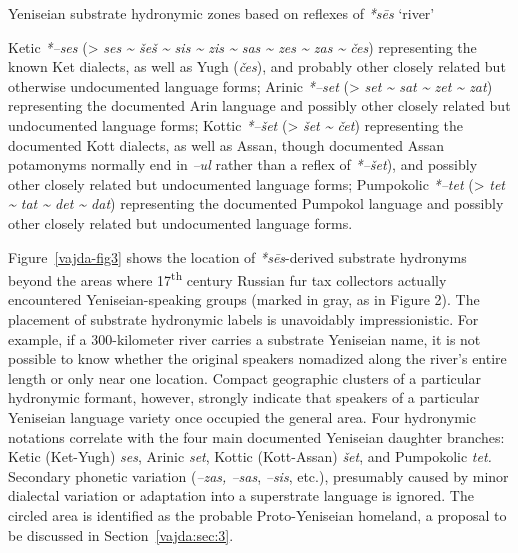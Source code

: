 
\begin{exe}\label{vajda-substrate}
\ex Yeniseian substrate hydronymic zones based on reflexes of \textit{*s\=es} ‘river’
\begin{xlist}
\ex Ketic \textit{*–ses} ({\textgreater}\textit{ ses \~{} šeš \~{} sis \~{} zis \~{} sas \~{} zes \~{} zas \~{} čes}) representing the known Ket dialects, as well as Yugh (\textit{čes}), and probably other closely related but otherwise undocumented language forms;
\ex Arinic \textit{*–set} ({\textgreater} \textit{set \~{} sat \~{} zet \~{} zat}) representing the documented Arin language and possibly other closely related but undocumented language forms;
\ex Kottic \textit{*–šet }({\textgreater} \textit{šet \~{} čet}) representing the documented Kott dialects, as well as Assan, though documented Assan potamonyms normally end in \textit{–ul} rather than a reflex of \textit{*–šet}), and possibly other closely related but undocumented language forms;
\ex Pumpokolic \textit{*–tet }({\textgreater} \textit{tet \~{} tat \~{} det \~{} dat}) representing the documented Pumpokol language and possibly other closely related but undocumented language forms.
\end{xlist}
\end{exe}

Figure~\ref{vajda-fig3} shows the location of \textit{*s\=es}{}-derived substrate hydronyms beyond the areas where 17\textsuperscript{th} century Russian fur tax collectors actually encountered Yeniseian-speaking groups (marked in gray, as in Figure 2). The placement of substrate hydronymic labels is unavoidably impressionistic. For example, if a 300-kilometer river carries a substrate Yeniseian name, it is not possible to know whether the original speakers nomadized along the river’s entire length or only near one location. Compact geographic clusters of a particular hydronymic formant, however, strongly indicate that speakers of a particular Yeniseian language variety once occupied the general area. Four hydronymic notations correlate with the four main documented Yeniseian daughter branches: Ketic (Ket-Yugh) \textit{ses}, Arinic \textit{set}, Kottic (Kott-Assan) \textit{šet}, and Pumpokolic \textit{tet. }Secondary phonetic variation (\textit{–zas, –sas}, \textit{–sis}, etc.), presumably caused by minor dialectal variation or adaptation into a superstrate language is ignored. The circled area is identified as the probable Proto-Yeniseian homeland, a proposal to be discussed in Section~\ref{vajda:sec:3}.



